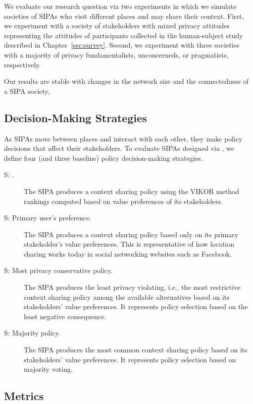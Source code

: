 We evaluate our research question via two experiments in which we simulate societies of \locationapp SIPAs who visit different places and may share their context. First, we experiment with a society of stakeholders with mixed privacy attitudes representing the attitudes of participants collected in the human-subject study described in Chapter~\ref{sec:survey}. Second, we experiment with three societies with a majority of privacy fundamentalists, unconcerneds, or pragmatists, respectively.

Our results are stable with changes in the network size and the connectedness of a SIPA society, 

\subsection{Decision-Making Strategies}
\label{sec:decision-making-strategies}

As \locationapp SIPAs move between places and interact with each other, they make policy decisions that affect their stakeholders. To evaluate SIPAs designed via \frameworkAinur, we define four (\frameworkAinur and three baseline) policy decision-making strategies. 

\begin{description}
\item[S\fsub{\frameworkAinur}: \frameworkAinur.] The SIPA produces a context sharing policy using the VIKOR method rankings computed based on value preferences of its stakeholders.
\item[S: Primary user's preference.] The SIPA produces a context sharing policy based only on its primary stakeholder's value preferences. This is representative of how location sharing works today in social networking websites such as Facebook. 
\item[S: Most privacy conservative policy.] The SIPA produces the least privacy violating, i.e., the most restrictive context sharing policy among the available alternatives based on its stakeholders' value preferences. It represents policy selection based on the least negative consequence. 
\item[S: Majority policy.] The SIPA produces the most common context sharing policy based on its stakeholders' value preferences. It represents policy selection based on majority voting. 
\end{description}

\subsection{Metrics}

